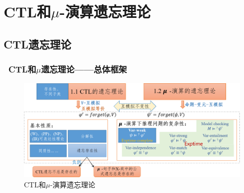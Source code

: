 \documentclass[9pt, CJK]{beamer}
\begin{document}
	\section{CTL和$\mu$-演算遗忘理论}
	\subsection{CTL遗忘理论}  
	\begin{frame}  
		\frametitle{~CTL和$\mu$遗忘理论——{\footnotesize 总体框架}}
		\begin{figure}
			\includegraphics[scale=0.35]{figures/ctlMuForgFrame}
			\caption{CTL和$\mu$-演算遗忘理论}
		\end{figure}
	\end{frame}
	
\end{document}
